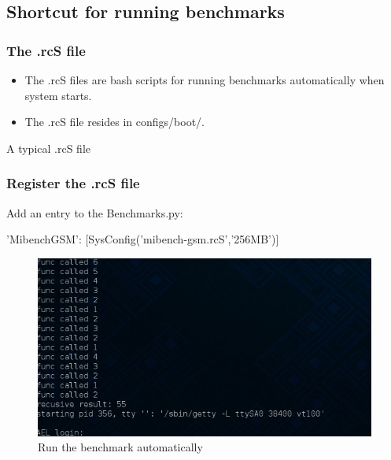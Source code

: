 \documentclass{beamer}
\begin{document}
\subsection{Shortcut for running benchmarks}
\begin{frame}
    \frametitle{The .rcS file}
    \begin{itemize}
    \item
    The .rcS files are bash scripts for running benchmarks automatically when system starts.
    \item
    The .rcS file resides in configs/boot/. 
    \end{itemize}
    \begin{example}{A typical .rcS file}   
	
    \end{example}
\end{frame}
\begin{frame}
    \frametitle{Register the .rcS file}
	Add an entry to the Benchmarks.py: 	
	\begin{example}
	    'MibenchGSM': [SysConfig('mibench-gsm.rcS','256MB')]
    	\end{example}
	\begin{figure}[H]
	    \begin{center}
		\includegraphics[scale=0.5]{back16.jpg}
	    \end{center}
	    \caption{Run the benchmark automatically}
	    \label{fig:runbench}
	\end{figure}
\end{frame}
\end{document}
